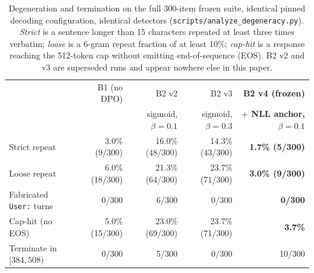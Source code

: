 \begin{table}[t]
\centering
\caption{Degeneration and termination on the full 300-item frozen suite, identical pinned
decoding configuration, identical detectors (\texttt{scripts/analyze\_degeneracy.py}).
\emph{Strict} is a sentence longer than 15 characters repeated at least three times
verbatim; \emph{loose} is a 6-gram repeat fraction of at least 10\%; \emph{cap-hit} is a
response reaching the 512-token cap without emitting end-of-sequence (EOS). B2 v2 and v3
are superseded runs and appear nowhere else in this paper.}
\label{tab:termination}
\small
\begin{tabular}{lrrrr}
\toprule
 & B1 (no DPO) & B2 v2 & B2 v3 & \textbf{B2 v4 (frozen)} \\
 & & sigmoid, $\beta{=}0.1$ & sigmoid, $\beta{=}0.3$ & \textbf{$+$ NLL anchor, $\beta{=}0.1$} \\
\midrule
Strict repeat            & 3.0\% (9/300)  & 16.0\% (48/300) & 14.3\% (43/300) & \textbf{1.7\% (5/300)} \\
Loose repeat             & 6.0\% (18/300) & 21.3\% (64/300) & 23.7\% (71/300) & \textbf{3.0\% (9/300)} \\
Fabricated \texttt{User:} turns & 0/300 & 6/300 & 0/300 & \textbf{0/300} \\
Cap-hit (no EOS)         & 5.0\% (15/300) & 23.0\% (69/300) & 23.7\% (71/300) & \textbf{3.7\%} \\
Terminate in $[384,508)$ & 0/300 & 5/300 & 0/300 & 10/300 \\
\bottomrule
\end{tabular}
\end{table}

